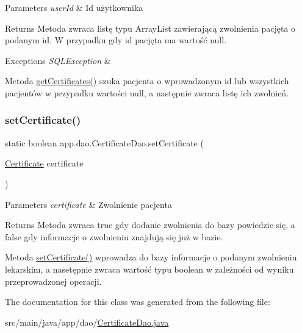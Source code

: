 \begin{DoxyParams}{Parameters}
{\em user\+Id} & Id użytkownika \\
\hline
\end{DoxyParams}
\begin{DoxyReturn}{Returns}
Metoda zwraca listę typu Array\+List zawierającą zwolnienia pacjęta o podanym id. W przypadku gdy id pacjęta ma wartość null. 
\end{DoxyReturn}

\begin{DoxyExceptions}{Exceptions}
{\em S\+Q\+L\+Exception} & \\
\hline
\end{DoxyExceptions}
Metoda \mbox{\hyperlink{classapp_1_1dao_1_1_certificate_dao_a62635ecd7b619b079f7a42bea0957257}{get\+Certificates()}} szuka pacjenta o wprowadzonym id lub wszystkich pacjentów w przypadku wartości null, a następnie zwraca listę ich zwolnień. \mbox{\label{classapp_1_1dao_1_1_certificate_dao_ade18e806b7233ecf641badf6d7fc2c52}} 
\subsubsection{\texorpdfstring{setCertificate()}{setCertificate()}}
{\footnotesize\ttfamily static boolean app.\+dao.\+Certificate\+Dao.\+set\+Certificate (\begin{DoxyParamCaption}\item[{\mbox{\hyperlink{classapp_1_1entity_1_1_certificate}{Certificate}}}]{certificate }\end{DoxyParamCaption})\hspace{0.3cm}{\ttfamily [static]}}


\begin{DoxyParams}{Parameters}
{\em certificate} & Zwolnienie pacjenta \\
\hline
\end{DoxyParams}
\begin{DoxyReturn}{Returns}
Metoda zwraca true gdy dodanie zwolnienia do bazy powiedzie się, a false gdy informacje o zwolnieniu znajdują się już w bazie.
\end{DoxyReturn}
Metoda \mbox{\hyperlink{classapp_1_1dao_1_1_certificate_dao_ade18e806b7233ecf641badf6d7fc2c52}{set\+Certificate()}} wprowadza do bazy informacje o podanym zwolnieniu lekarskim, a nasetępnie zwraca wartość typu boolean w zależności od wyniku przeprowadzonej operacji. 

The documentation for this class was generated from the following file\+:\begin{DoxyCompactItemize}
\item 
src/main/java/app/dao/\mbox{\hyperlink{_certificate_dao_8java}{Certificate\+Dao.\+java}}\end{DoxyCompactItemize}
